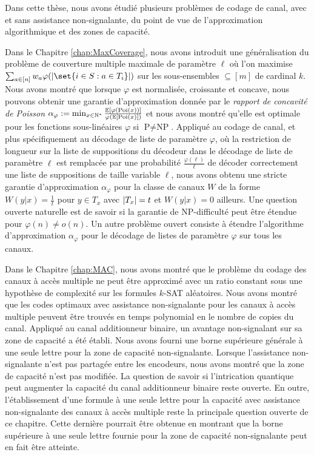 Dans cette thèse, nous avons étudié plusieurs problèmes de codage de canal, avec et sans assistance non-signalante, du point de vue de l'approximation algorithmique et des zones de capacité.

Dans le Chapitre \ref{chap:MaxCoverage}, nous avons introduit une généralisation du problème de couverture multiple maximale de paramètre $\ell$ où l'on maximise $\sum_{a \in [n]} w_a\varphi(\abs{\set{i \in S : a \in T_i}})$ sur les sous-ensembles $\subseteq [m]$ de cardinal $k$. Nous avons montré que lorsque $\varphi$ est normalisée, croissante et concave, nous pouvons obtenir une garantie d'approximation donnée par le \emph{rapport de concavité de Poisson} $\alpha_{\varphi} := \min_{x \in \mathbb{N}^*} \frac{\mathbb{E}[\varphi(\operatorname{\text{Poi}}(x))]}{\varphi(\mathbb{E}[\operatorname{\text{Poi}}(x)])}$ et nous avons montré qu'elle est optimale pour les fonctions sous-linéaires $\varphi$ si $\textrm{P}\not=\textrm{NP}$. Appliqué au codage de canal, et plus spécifiquement au décodage de liste de paramètre $\varphi$, où la restriction de longueur sur la liste de suppositions du décodeur dans le décodage de liste de paramètre $\ell$ est remplacée par une probabilité $\frac{\varphi(\ell)}{\ell}$ de décoder correctement une liste de suppositions de taille variable $\ell$, nous avons obtenu une stricte garantie d'approximation $\alpha_{\varphi}$ pour la classe de canaux $W$ de la forme $W(y|x) = \frac{1}{t}$ pour $y \in T_x$ avec $\abs{T_x}=t$ et $W(y|x) = 0$ ailleurs. Une question ouverte naturelle est de savoir si la garantie de \textrm{NP}-difficulté peut être étendue pour $\varphi(n) \not= o(n)$. Un autre problème ouvert consiste à étendre l'algorithme d'approximation $\alpha_{\varphi}$ pour le décodage de listes de paramètre $\varphi$ sur tous les canaux.

Dans le Chapitre \ref{chap:MAC}, nous avons montré que le problème du codage des canaux à accès multiple ne peut être approximé avec un ratio constant sous une hypothèse de complexité sur les formules $k$-SAT aléatoires. Nous avons montré que les codes optimaux avec assistance non-signalante pour les canaux à accès multiple peuvent être trouvés en temps polynomial en le nombre de copies du canal. Appliqué au canal additionneur binaire, un avantage non-signalant sur sa zone de capacité a été établi. Nous avons fourni une borne supérieure générale à une seule lettre pour la zone de capacité non-signalante. Lorsque l'assistance non-signalante n'est pas partagée entre les encodeurs, nous avons montré que la zone de capacité n'est pas modifiée. La question de savoir si l'intrication quantique peut augmenter la capacité du canal additionneur binaire reste ouverte. En outre, l'établissement d'une formule à une seule lettre pour la capacité avec assistance non-signalante des canaux à accès multiple reste la principale question ouverte de ce chapitre. Cette dernière pourrait être obtenue en montrant que la borne supérieure à une seule lettre fournie pour la zone de capacité non-signalante peut en fait être atteinte.

